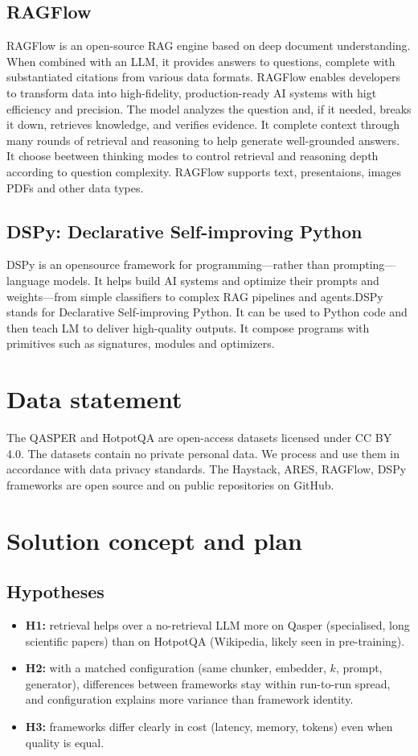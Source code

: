 \documentclass[11pt]{article}
\begin{document}
\subsection{RAGFlow}
RAGFlow is an open-source RAG engine based on deep document understanding. When combined with an LLM, it provides answers to questions, complete with substantiated citations from various data formats. RAGFlow enables developers to transform data into high-fidelity, production-ready AI systems with higt efficiency and precision. The model analyzes the question and, if it needed, breaks it down, retrieves knowledge, and verifies evidence. It complete context through many rounds of retrieval and reasoning to help generate well-grounded answers. It choose beetween thinking modes to control retrieval and reasoning depth according to question complexity. RAGFlow supports text, presentaions, images PDFs and other data types.

\subsection{DSPy: Declarative Self-improving Python}
DSPy is an opensource framework for programming—rather than prompting—language models.
It helps build AI systems and optimize their prompts and weights—from simple classifiers to complex RAG pipelines and agents.DSPy stands for Declarative Self-improving Python. It can be used to Python code and then teach LM to deliver high-quality outputs. It compose programs with  primitives such as signatures, modules and optimizers.

\section{Data statement}
The QASPER and HotpotQA are open-access datasets licensed under CC BY 4.0. The datasets contain no private personal data. We process and use them in accordance with data privacy standards.
The Haystack, ARES, RAGFlow, DSPy frameworks are open source and on public repositories on GitHub.

\section{Solution concept and plan}

\subsection{Hypotheses}
\begin{itemize}
    \item \textbf{H1:} retrieval helps over a no-retrieval LLM more on Qasper (specialised, long scientific papers) than on HotpotQA (Wikipedia, likely seen in pre-training).
    \item \textbf{H2:} with a matched configuration (same chunker, embedder, $k$, prompt, generator), differences between frameworks stay within run-to-run spread, and configuration explains more variance than framework identity.
    \item \textbf{H3:} frameworks differ clearly in cost (latency, memory, tokens) even when quality is equal.
\end{itemize}
\end{document}
